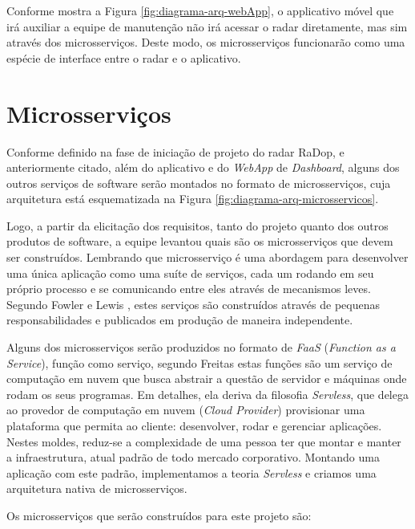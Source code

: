 Conforme mostra a Figura \ref{fig:diagrama-arq-webApp}, o applicativo móvel que irá auxiliar a equipe de manutenção não irá acessar o radar diretamente, mas sim através dos microsserviços. Deste modo, os microsserviços funcionarão como uma espécie de interface entre o radar e o aplicativo.

\section{Microsserviços}

Conforme definido na fase de iniciação de projeto do radar RaDop, e anteriormente citado, além do aplicativo e do \textit{WebApp} de \textit{Dashboard}, alguns dos outros serviços de software serão montados no formato de microsserviços, cuja arquitetura está esquematizada na Figura \ref{fig:diagrama-arq-microsservicos}.

Logo, a partir da elicitação dos requisitos, tanto do projeto quanto dos outros produtos de software, a equipe levantou quais são os microsserviços que devem ser construídos. Lembrando que microsserviço é uma abordagem para desenvolver uma única aplicação como uma suíte de serviços, cada um rodando em seu próprio processo e se comunicando entre eles através de mecanismos leves. Segundo Fowler e Lewis \cite{fowler2015}, estes serviços são construídos através de pequenas responsabilidades e publicados em produção de maneira independente.

Alguns dos microsserviços serão produzidos no formato de \textit{FaaS} (\textit{Function as a Service}), função como serviço, segundo Freitas \cite{freitas2018} estas funções são um serviço de computação em nuvem que busca abstrair a questão de servidor e máquinas onde rodam os seus programas. Em detalhes, ela deriva da filosofia \textit{Servless}, que delega ao provedor de computação em nuvem (\textit{Cloud Provider}) provisionar uma plataforma que permita ao cliente: desenvolver, rodar e gerenciar aplicações. Nestes moldes, reduz-se a complexidade de uma pessoa ter que montar e manter a infraestrutura, atual padrão de todo mercado corporativo. Montando uma aplicação com este padrão, implementamos a teoria \textit{Servless} e criamos uma arquitetura nativa de microsserviços.


Os microsserviços que serão construídos para este projeto são:

